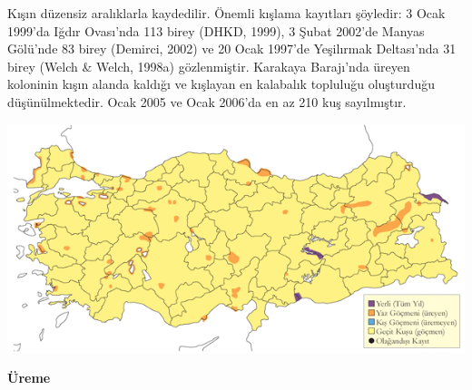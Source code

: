 \documentclass[
  a4paper,
  DIV=11,
  numbers=noendperiod]{scrreprt}
\begin{document}
Kışın düzensiz aralıklarla kaydedilir. Önemli kışlama kayıtları
şöyledir: 3 Ocak 1999'da Iğdır Ovası'nda 113 birey (DHKD, 1999), 3 Şubat
2002'de Manyas Gölü'nde 83 birey (Demirci, 2002) ve 20 Ocak 1997'de
Yeşilırmak Deltası'nda 31 birey (Welch \& Welch, 1998a) gözlenmiştir.
Karakaya Barajı'nda üreyen koloninin kışın alanda kaldığı ve kışlayan en
kalabalık topluluğu oluşturduğu düşünülmektedir. Ocak 2005 ve Ocak
2006'da en az 210 kuş sayılmıştır.

\includegraphics{images/harita_Page_066.png}

\textbf{Üreme}
\end{document}

